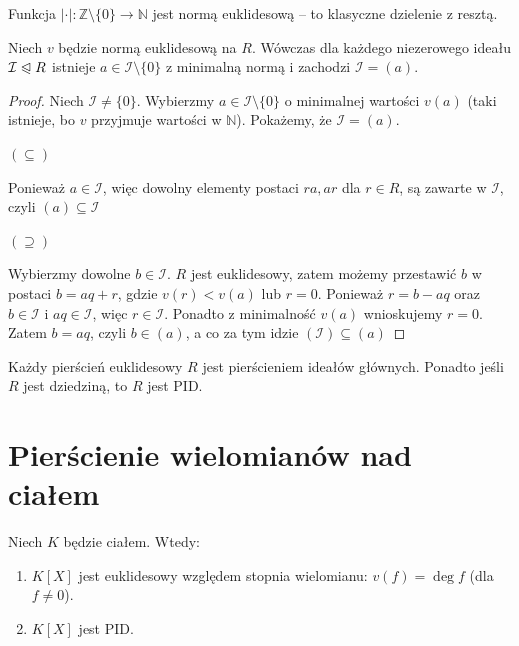 \begin{eg}
Funkcja $|\cdot|: \mathbb{Z} \setminus \{0\} \to \mathbb{N}$ jest normą euklidesową – to klasyczne dzielenie z resztą.
\end{eg}

\begin{theorem}
Niech $v$ będzie normą euklidesową na $R$. Wówczas dla każdego niezerowego ideału $\mathcal{I} \trianglelefteqslant R$ istnieje $a \in \mathcal{I} \setminus \{0\}$ z minimalną normą i zachodzi $\mathcal{I} = (a)$.
\end{theorem}
\begin{proof}
Niech $\mathcal{I} \neq \{0\}$. Wybierzmy $a \in \mathcal{I} \setminus \{0\}$ o minimalnej wartości $v(a)$ (taki istnieje, bo $v$ przyjmuje wartości w $\mathbb{N}$). Pokażemy, że $\mathcal{I} = (a)$.

\noindent $\left( \subseteq \right) $

Ponieważ $a \in \mathcal{I}$, więc dowolny elementy postaci $ra, ar$ dla  $r \in R$, są zawarte w $\mathcal{I}$, czyli $\left( a \right) \subseteq \mathcal{I}$

\noindent $\left( \supseteq  \right) $ 

Wybierzmy dowolne $b \in \mathcal{I}$. $R$ jest euklidesowy, zatem możemy przestawić $b$ w postaci $b = aq + r$, gdzie  $v\left( r \right) < v\left( a \right) $ lub $r = 0$. Ponieważ  $r = b - aq$ oraz  $b \in \mathcal{I}$ i $aq \in \mathcal{I}$, więc $r \in \mathcal{I}$. Ponadto z minimalność $v\left( a \right) $ wnioskujemy $r = 0$. Zatem $b = aq$, czyli  $b \in \left( a \right)  $, a co za tym idzie $\left( \mathcal{I} \right) \subseteq \left( a \right) $
\end{proof}

\begin{corollary}
Każdy pierścień euklidesowy $R$ jest pierścieniem ideałów głównych. Ponadto jeśli $R$ jest dziedziną, to $R$ jest PID.
\end{corollary}

\section{Pierścienie wielomianów nad ciałem}

\begin{theorem}
Niech $K$ będzie ciałem. Wtedy:
\begin{enumerate}[label=\arabic*)]
    \item $K[X]$ jest euklidesowy względem stopnia wielomianu: $v(f) = \deg f$ (dla $f \neq 0$).
    \item $K[X]$ jest PID.
\end{enumerate}
\end{theorem}

